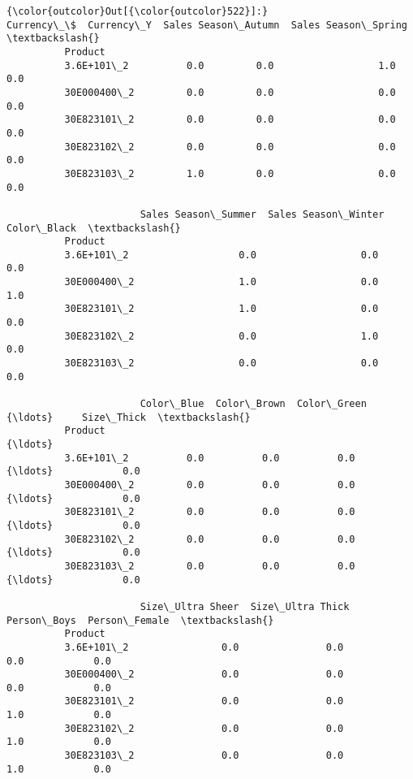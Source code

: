 \documentclass[11pt]{article}
\begin{document}
\begin{Verbatim}[commandchars=\\\{\}]
{\color{outcolor}Out[{\color{outcolor}522}]:}              Currency\_\$  Currency\_Y  Sales Season\_Autumn  Sales Season\_Spring  \textbackslash{}
          Product                                                                         
          3.6E+101\_2          0.0         0.0                  1.0                  0.0   
          30E000400\_2         0.0         0.0                  0.0                  0.0   
          30E823101\_2         0.0         0.0                  0.0                  0.0   
          30E823102\_2         0.0         0.0                  0.0                  0.0   
          30E823103\_2         1.0         0.0                  0.0                  0.0   
          
                       Sales Season\_Summer  Sales Season\_Winter  Color\_Black  \textbackslash{}
          Product                                                              
          3.6E+101\_2                   0.0                  0.0          0.0   
          30E000400\_2                  1.0                  0.0          1.0   
          30E823101\_2                  1.0                  0.0          0.0   
          30E823102\_2                  0.0                  1.0          0.0   
          30E823103\_2                  0.0                  0.0          0.0   
          
                       Color\_Blue  Color\_Brown  Color\_Green    {\ldots}     Size\_Thick  \textbackslash{}
          Product                                              {\ldots}                  
          3.6E+101\_2          0.0          0.0          0.0    {\ldots}            0.0   
          30E000400\_2         0.0          0.0          0.0    {\ldots}            0.0   
          30E823101\_2         0.0          0.0          0.0    {\ldots}            0.0   
          30E823102\_2         0.0          0.0          0.0    {\ldots}            0.0   
          30E823103\_2         0.0          0.0          0.0    {\ldots}            0.0   
          
                       Size\_Ultra Sheer  Size\_Ultra Thick  Person\_Boys  Person\_Female  \textbackslash{}
          Product                                                                       
          3.6E+101\_2                0.0               0.0          0.0            0.0   
          30E000400\_2               0.0               0.0          0.0            0.0   
          30E823101\_2               0.0               0.0          1.0            0.0   
          30E823102\_2               0.0               0.0          1.0            0.0   
          30E823103\_2               0.0               0.0          1.0            0.0   
          

\end{Verbatim}
\end{document}
